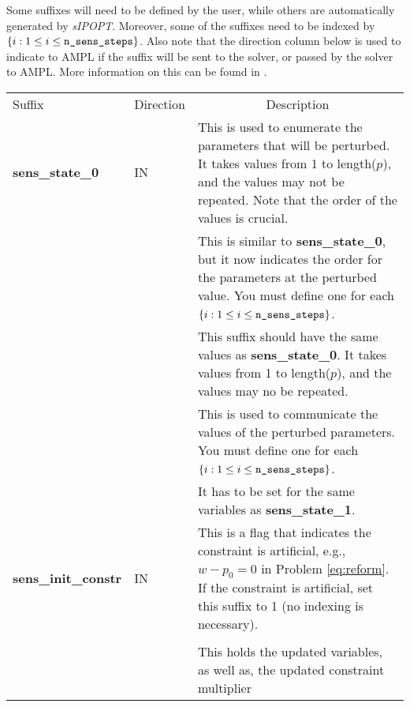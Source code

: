 \documentclass[letter, 11pt]{article}
\newcommand{\sensKKT}{\emph{sIPOPT}}
\newcommand{\AMPL}{AMPL}
\newcommand{\curls}[1]{\ensuremath{\left\{ #1 \right\}}}
\newcommand{\statez}{sens\_state\_0}
\newcommand{\stateo}{sens\_state\_1}
\newcommand{\initc}{sens\_init\_constr}
\newcommand{\statei}[1]{sens\_state\_#1}
\newcommand{\statevi}[1]{sens\_state\_value\_#1}
\newcommand{\sstatei}[1]{sens\_sol\_state\_#1}
\newcommand{\nstepsopt}{n\_sens\_steps}
\begin{document}
Some suffixes will need to be defined by the user, while others are automatically generated by {\sensKKT}. Moreover,
some of the suffixes need to be indexed by  $\curls{i: 1 \leq i \leq \mbox{\texttt{\nstepsopt}}}$. Also note that the
direction column below is used to indicate to {\AMPL} if the suffix will be sent to the solver, or passed by the solver to {\AMPL}.
More information on this can be found in \cite{ampl}.\\

\begin{tabular}{|>{\centering}m{3.5cm}|>{\centering}m{2cm}|m{}|}\hline
\multicolumn{3}{|c|}{\textbf{Defined by User}} \\ \hline
Suffix & Direction & \multicolumn{1}{c|}{Description}  \\ \hline
\textbf{\statez} & IN & This is used to enumerate the parameters that will be perturbed. It takes values from 1 to length($p$), and
                      the values may not be repeated. Note that the order of the values is crucial.\\ \hline
\multirow{2}{*}{\textbf{\statei{\emph{i}}}} & \multirow{2}{*}{IN } &
                         This is similar to \textbf{\statez}, but it now indicates the order for the parameters at the perturbed value.
						 You must define one for each $\curls{i: 1 \leq i \leq \mbox{\texttt{\nstepsopt}}}$. \\
                      && This suffix should have the same values as \textbf{\statez}. It takes values from 1 to length($p$), and
                         the values may no be repeated.\\ \hline
\multirow{2}{*}{\textbf{\statevi{\emph{i}}}} & \multirow{2}{*}{IN} &
                           This is used to communicate the values of the perturbed parameters.
					       You must define one for each  $\curls{i: 1 \leq i \leq \mbox{\texttt{\nstepsopt}}}$. \\
                      &&   It has to be set for the same variables as \textbf{\stateo}.\\ \hline
\textbf{\initc} & IN & This is a flag that indicates the constraint is artificial, e.g., $w - p_0=0$ in Problem \eqref{eq:reform}.
              If the constraint is artificial, set this suffix to 1 (no indexing is necessary). \\ \hline
\multicolumn{3}{|c|}{\textbf{Defined by \sensKKT}} \\ \hline
\multirow{2}{*}{\textbf{\sstatei{\emph{i}}}} & \multirow{2}{*}{OUT} &  This holds the updated variables, as well as, the updated constraint multiplier

\end{tabular}
\end{document}
